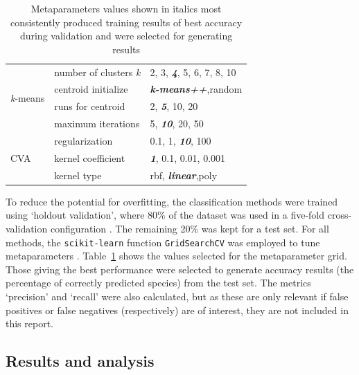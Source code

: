 \documentclass[a4paper, 11pt]{article}
\begin{document}
\begin{table}
\begin{center}
\begin{tabular}{l|l|l}
  \hline
  \multirow{4}{*}{\textit{k}-means} & number of clusters \textit{k}  & 2, 3, \textit{\textbf{4}}, 5, 6, 7, 8, 10\\
                                    & centroid initialize         & \textit{\textbf{k-means++}},random\\
                                    & runs for centroid	     & 2, \textit{\textbf{5}}, 10, 20 \\
                                    & maximum iterations           & 5, \textit{\textbf{10}}, 20, 50 \\
  \hline
    \multirow{3}{*}{CVA}            & regularization   & 0.1, 1, \textit{\textbf{10}}, 100 \\
                                    & kernel coefficient      & \textit{\textbf{1}}, 0.1, 0.01, 0.001 \\
                                    & kernel type                  & rbf, \textit{\textbf{linear}},poly \\
  \hline
  \end{tabular}
  \vspace{-2\baselineskip} %
  \end{center} 
  \caption{\centering\linespread{0.8}\selectfont Metaparameters values shown in italics most consistently produced training results of 
  best accuracy during validation and were selected for generating results}
  \vspace{-1\baselineskip} %
  \label{tab:metaparameters}
\end{table} 

To reduce the potential for overfitting, the classification methods were trained using 
`holdout validation', where 80\% of the dataset was used in a five-fold cross-validation 
configuration \cite{james2013introduction}. The remaining 20\% was kept for a test set. For all methods, 
the \texttt{scikit-learn} function \texttt{GridSearchCV} was employed to tune metaparameters \cite{scikit-learn}. 
Table~\ref{tab:metaparameters} shows the values selected for the metaparameter grid. Those giving the best 
performance were selected to generate accuracy results (the percentage of correctly predicted species) 
from the test set. The metrics `precision' and `recall' were also calculated, but as 
these are only relevant if false positives or false negatives (respectively) are of interest, 
they are not included in this report.


\subsection*{Results and analysis}
\end{document}
